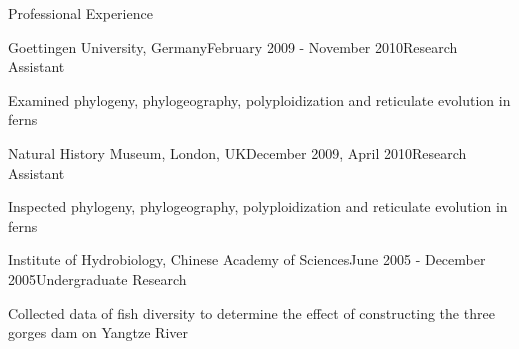 \documentclass{resume} %
\begin{document}
\begin{rSection}{Professional Experience}
\begin{rSubsection}{Goettingen University, Germany}{February 2009 - November 2010}{Research Assistant}{}
\item Examined phylogeny, phylogeography, polyploidization and reticulate evolution in ferns
\end{rSubsection}

\begin{rSubsection}{Natural History Museum, London, UK}{December 2009, April 2010}{Research Assistant}{}
\item Inspected phylogeny, phylogeography, polyploidization and reticulate evolution in ferns
\end{rSubsection}

\begin{rSubsection}{Institute of Hydrobiology, Chinese Academy of Sciences}{June 2005 - December 2005}{Undergraduate Research}{}
\item Collected data of fish diversity to determine the effect of constructing the three gorges dam on Yangtze River 
\end{rSubsection}

\end{rSection}
\end{document}
